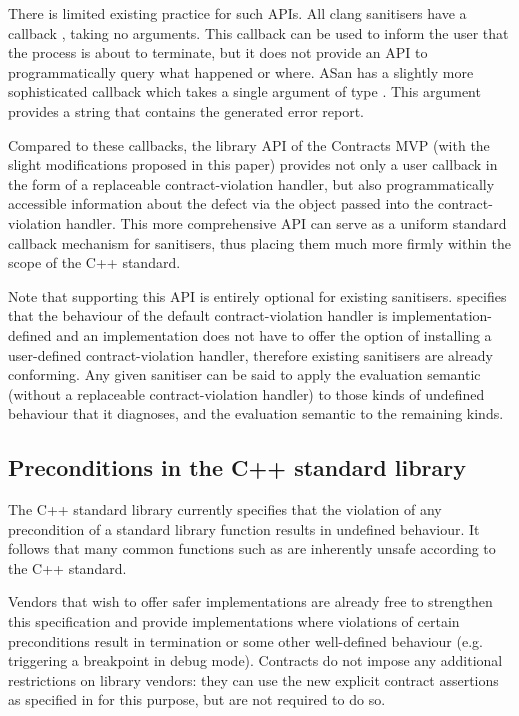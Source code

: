 There is limited existing practice for such APIs. All clang sanitisers have a callback , taking no arguments. This callback can be used to inform the user that the process is about to terminate, but it does not provide an API to programmatically query what happened or where. ASan has a slightly more sophisticated callback  which takes a single argument of type . This argument provides a string that contains the generated error report.

Compared to these callbacks, the library API of the Contracts MVP (with the slight modifications proposed in this paper) provides not only a user callback in the form of a replaceable contract-violation handler, but also programmatically accessible information about the defect via the  \mbox{} object passed into the contract-violation handler. This more comprehensive API can serve as a uniform standard callback mechanism for sanitisers, thus placing them much more firmly within the scope of the C++ standard.

Note that supporting this API is entirely optional for existing sanitisers. \cite{P2900R6} specifies that the behaviour of the default contract-violation handler is implementation-defined and an implementation does not have to offer the option of installing a user-defined contract-violation handler, therefore existing sanitisers are already conforming. Any given sanitiser can be said to apply the  evaluation semantic (without a replaceable contract-violation handler) to those kinds of undefined behaviour that it diagnoses, and the  evaluation semantic to the remaining kinds.

\subsection{Preconditions in the C++ standard library}

The C++ standard library currently specifies that the violation of any precondition of a standard library function results in undefined behaviour. It follows that many common functions such as  are inherently unsafe according to the C++ standard.

Vendors that wish to offer safer implementations are already free to strengthen this specification and provide implementations where violations of certain preconditions result in termination or some other well-defined behaviour (e.g. triggering a breakpoint in debug mode). Contracts do not impose any additional restrictions on library vendors: they can use the new explicit contract assertions as specified in \cite{P2900R6} for this purpose, but are not required to do so.


